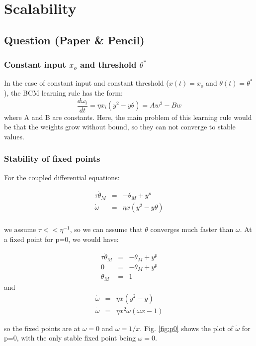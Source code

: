 \section{Scalability}

\subsection{Question (Paper \& Pencil)}     %

\subsubsection{Constant input $x_o$ and threshold $\theta^*$}       %
In the case of constant input and constant threshold ($x(t)=x_o$ and $\theta(t) = \theta^*$), the BCM learning rule has the form: 
\begin{equation}
\frac{d\omega_i}{dt} = \eta x_i(y^2-y\theta)= Aw^2-Bw
\end{equation}
where A and B are constants. Here, the main problem of this learning rule would be that the weights grow without bound, so they can not converge to stable values.  
\subsubsection{Stability of fixed points}
For the coupled differential equations: 

\begin{eqnarray}
\tau \dot \theta_M &=&  -\theta_M + y^p \\
\dot \omega &=& \eta x (y^2-y\theta) \\
\end{eqnarray}

we assume $\tau << \eta^{-1}$, so we can assume that $\theta$ converges much faster than $\omega$. At a fixed point for p=0, we would have: 

\begin{eqnarray}
\tau \dot \theta_M &=&  -\theta_M + y^p \\
0 &=& -\theta_M + y^p \\
\theta_M &=& 1
\end{eqnarray}
and 
\begin{eqnarray}
\dot \omega &=& \eta x (y^2-y) \\
\dot \omega &=& \eta x^2 \omega (\omega x- 1) \label{eq:p0}
\end{eqnarray}

so the fixed points are at $\omega = 0$ and $\omega = 1/x$. Fig. \ref{fig:p0} shows the plot of $\dot \omega$ for p=0, with the only stable fixed point being $\omega = 0$. 

